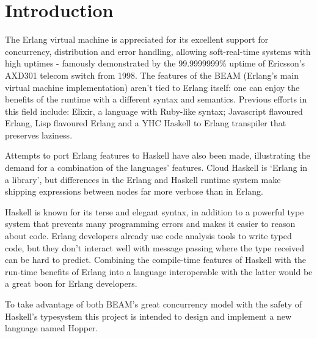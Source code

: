 \chapter{Introduction}
The Erlang virtual machine is appreciated for its excellent support for
concurrency, distribution and error handling, allowing soft-real-time systems
with high uptimes - famously demonstrated by the 99.9999999\% uptime of
Ericsson’s AXD301 telecom switch from 1998. The features of the BEAM (Erlang’s
main virtual machine implementation) aren't tied to Erlang itself: one can
enjoy the benefits of the runtime with a different syntax and semantics.
Previous efforts in this field include: Elixir, a language with Ruby-like
syntax; Javascript flavoured Erlang, Lisp flavoured Erlang and a YHC Haskell
to Erlang transpiler that preserves laziness.

Attempts to port Erlang features to Haskell have also been made, illustrating
the demand for a combination of the languages’ features. Cloud Haskell is
‘Erlang in a library’, but differences in the Erlang and Haskell runtime
system make shipping expressions between nodes far more verbose than in Erlang.

Haskell is known for its terse and elegant syntax, in addition to a powerful
type system that prevents many programming errors and makes it easier to
reason about code. Erlang developers already use code analysis tools to write
typed code, but they don’t interact well with message passing where the type
received can be hard to predict. Combining the compile-time features of Haskell
with the run-time benefits of Erlang into a language interoperable with the
latter would be a great boon for Erlang developers.

To take advantage of both BEAM's great concurrency model with the safety of 
Haskell's typesystem this project is intended to design and implement a new 
language named Hopper.  
